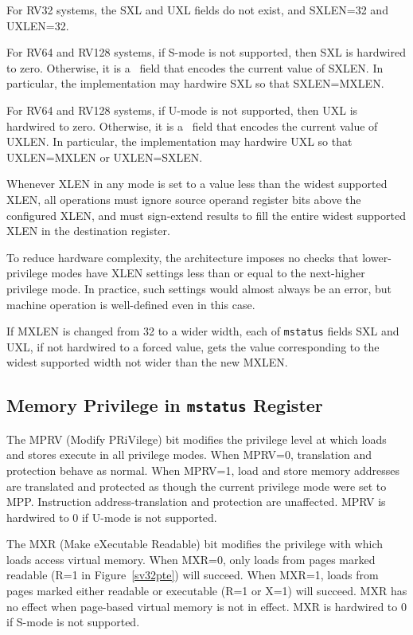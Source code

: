 For RV32 systems, the SXL and UXL fields do not exist, and
SXLEN=32 and UXLEN=32.

For RV64 and RV128 systems, if S-mode is not supported, then SXL is hardwired
to zero.  Otherwise, it is a \warl\ field that encodes the current value of
SXLEN.  In particular, the implementation may hardwire SXL so that
SXLEN=MXLEN.

For RV64 and RV128 systems, if U-mode is not supported, then UXL is hardwired
to zero.  Otherwise, it is a \warl\ field that encodes the current value of
UXLEN.  In particular, the implementation may hardwire UXL so that
UXLEN=MXLEN or UXLEN=SXLEN.

Whenever XLEN in any mode is set to a value less than the widest
supported XLEN, all operations must ignore source operand register
bits above the configured XLEN, and must sign-extend results to fill
the entire widest supported XLEN in the destination register.

\begin{commentary}
To reduce hardware complexity, the architecture imposes no checks that
lower-privilege modes have XLEN settings less than or equal to the
next-higher privilege mode.  In practice, such settings would almost
always be an error, but machine operation is well-defined even in this
case.
\end{commentary}

If MXLEN is changed from 32 to a wider width, each of {\tt mstatus} fields SXL and
UXL, if not hardwired to a forced value, gets the value corresponding to the
widest supported width not wider than the new MXLEN.

\subsection{Memory Privilege in {\tt mstatus} Register}

The MPRV (Modify PRiVilege) bit modifies the privilege level at which
loads and stores execute in all privilege modes.  When MPRV=0,
translation and protection behave as normal.  When MPRV=1, load and
store memory addresses are translated and protected as though the
current privilege mode were set to MPP.  Instruction
address-translation and protection are unaffected.  MPRV is hardwired
to 0 if U-mode is not supported.

The MXR (Make eXecutable Readable) bit modifies the privilege with which loads
access virtual memory.  When MXR=0, only loads from pages marked readable (R=1
in Figure~\ref{sv32pte}) will succeed.  When MXR=1, loads from pages marked
either readable or executable (R=1 or X=1) will succeed.  MXR has no effect
when page-based virtual memory is not in effect.  MXR is hardwired to 0 if
S-mode is not supported.

